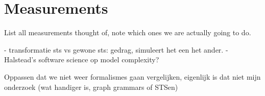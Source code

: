\section{Measurements}\label{sec:measurements}

List all measurements thought of, note which ones we are actually going to do.

- transformatie sts vs gewone sts: gedrag, simuleert het een het ander.
- Halstead's software science op model complexity?

Oppassen dat we niet weer formalismes gaan vergelijken, eigenlijk is dat niet mijn onderzoek (wat handiger is, graph grammars of STSen)
